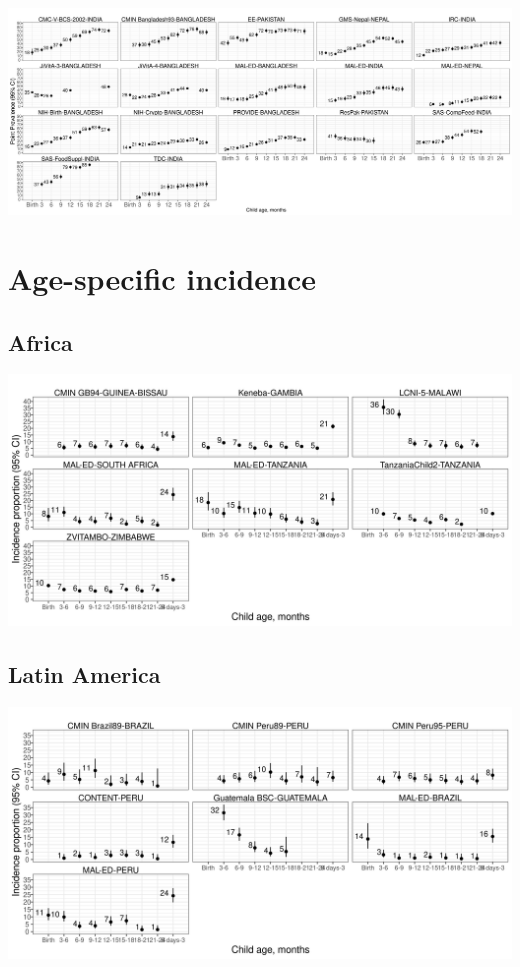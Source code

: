 \documentclass[
  9pt,
]{book}
\begin{document}
\includegraphics[width=70.83in]{figures//stunting/fig-stunt-2-prev-cohort-asia-allage-primary}

\hypertarget{age-specific-incidence}{%
\section{Age-specific incidence}\label{age-specific-incidence}}

\hypertarget{africa-2}{%
\subsection{Africa}\label{africa-2}}

\includegraphics[width=41.67in]{figures//stunting/fig-stunt-2-inc-cohort-africa-allage-primary}

\hypertarget{latin-america-2}{%
\subsection{Latin America}\label{latin-america-2}}

\includegraphics[width=41.67in]{figures//stunting/fig-stunt-2-inc-cohort-latamer-allage-primary}
\end{document}
